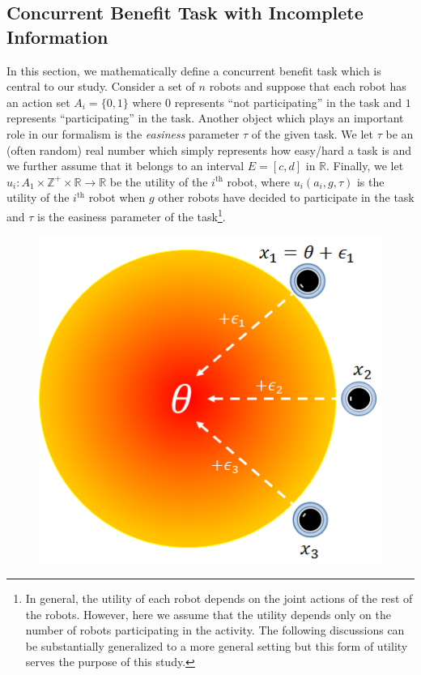 \documentclass[conference]{ieeeconf}
\def\Z{\mathbb{Z}}
\def\R{\mathbb{R}}
\begin{document}
\subsection{Concurrent Benefit Task with Incomplete Information}\label{sec:conbenefit}
In this section, we mathematically define a concurrent benefit task which is central to our study. Consider a set of $n$ robots and suppose that each robot has an action set $A_i=\{0,1\}$ where $0$ represents ``not participating'' in the task and $1$ represents ``participating'' in the task.  Another object which plays an important role in our formalism is the \textit{easiness} parameter $\tau$ of the given task. We let $\tau$ be an (often random) real number which simply represents how easy/hard a task is and we further assume that it belongs to an interval $E=[c,d]$ in $\R$.  Finally, we let $u_i:A_1\times\Z^+\times \R\to \R$ be the utility of the $i^{\text{th}}$ robot, where $u_i(a_i,g,\tau)$ is the utility of the $i^{\text{th}}$ robot when $g$ other robots have decided to participate in the task and $\tau$ is the easiness parameter of the task\footnote{In general, the utility of each robot depends on the joint actions of the rest of the robots. However, here we assume that the utility depends only on the number of robots participating in the activity. The following discussions can be substantially generalized to a more general setting but this form of utility serves the purpose of this study.}. 

\begin{figure}[!htb]
\centering\includegraphics[width=.75\columnwidth]{../figures/globalgamesetup.png}
\centering\caption{}\label{fig:ggsetup}
\end{figure}
\end{document}
